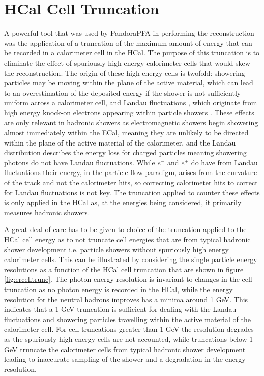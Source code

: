 
\section{HCal Cell Truncation}
\label{sec:hcalcelltruncation}
A powerful tool that was used by PandoraPFA in performing the reconstruction was the application of a truncation of the maximum amount of energy that can be recorded in a calorimeter cell in the HCal.  The purpose of this truncation is to eliminate the effect of spuriously high energy calorimeter cells that would skew the reconstruction.  The origin of these high energy cells is twofold: showering particles may be moving within the plane of the active material, which can lead to an overestimation of the deposited energy if the shower is not sufficiently uniform across a calorimeter cell, and Landau fluctuations \cite{Landau:1944if}, which originate from high energy knock-on electrons appearing within particle showers \cite{Bichsel:2004ej}.  These effects are only relevant in hadronic showers as electromagnetic showers begin showering almost immediately within the ECal, meaning they are unlikely to be directed within the plane of the active material of the calorimeter, and the Landau distribution describes the energy loss for charged particles meaning showering photons do not have Landau fluctuations.  While $e^{-}$ and $e^{+}$ do have from Landau fluctuations their energy, in the particle flow paradigm, arises from the curvature of the track and not the calorimeter hits, so correcting calorimeter hits to correct for Landau fluctuations is not key.  The truncation applied to counter these effects is only applied in the HCal as, at the energies being considered, it primarily measures hadronic showers.  

A great deal of care has to be given to choice of the truncation applied to the HCal cell energy as to not truncate cell energies that are from typical hadronic shower development i.e. particle showers without spuriously high energy calorimeter cells.  This can be illustrated by considering the single particle energy resolutions as a function of the HCal cell truncation that are shown in figure \ref{fig:ercelltrunc}.  The photon energy resolution is invariant to changes in the cell truncation as no photon energy is recorded in the HCal, while the energy resolution for the neutral hadrons improves has a minima around 1 GeV.  This indicates that a 1 GeV truncation is sufficient for dealing with the Landau fluctuations and showering particles travelling within the active material of the calorimeter cell.  For cell truncations greater than 1 GeV the resolution degrades as the spuriously high energy cells are not accounted, while truncations below 1 GeV truncate the calorimeter cells from typical hadronic shower development leading to inaccurate sampling of the shower and a degradation in the energy resolution.  

